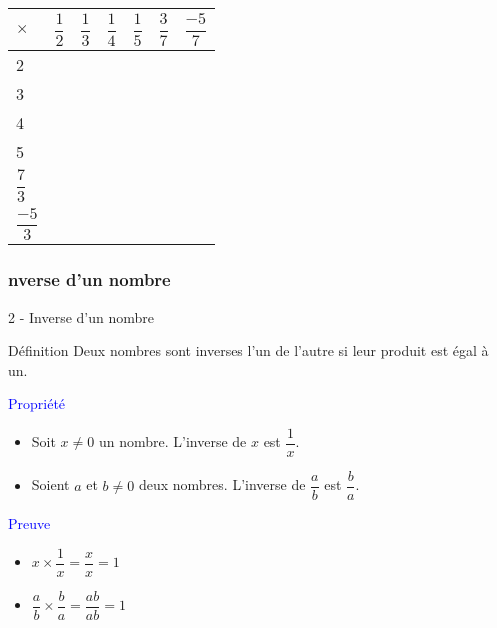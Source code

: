 \documentclass{beamer}
\begin{document}
\begin{frame}


  \begin{center}
    \begin{tabular}{| m{1.2cm} || m{1.2cm} | m{1.2cm} | m{1.2cm} | m{1.2cm} | m{1.2cm} | m{1.2cm} |}
      \hline
      $\times$ & $\dfrac{1}{2}$ & $\dfrac{1}{3}$ & $\dfrac{1}{4}$ & $\dfrac{1}{5}$ & $\dfrac{3}{7}$ & $\dfrac{-5}{7}$ \\
      \hline
      \hline
      2               & \phantom{$\dfrac{azerty}{a}$} & & & & & \\ 
      \hline
      3               & \phantom{$\dfrac{azerty}{a}$} & & & & & \\ 
      \hline
      4               & \phantom{$\dfrac{azerty}{a}$} & & & & & \\ 
      \hline
      5               & \phantom{$\dfrac{azerty}{a}$} & & & & & \\ 
      \hline
      $\dfrac{7}{3}$  & \phantom{$\dfrac{azerty}{a}$} & & & & & \\ 
      \hline
      $\dfrac{-5}{3}$ & \phantom{$\dfrac{azerty}{a}$} & & & & & \\ 
      \hline
    \end{tabular}
  \end{center}


\end{frame}



\begin{frame}
  \frametitle{nverse d'un nombre}

  \alert{2 - Inverse d'un nombre}

  \begin{alertblock}{Définition}
    Deux nombres sont inverses l'un de l'autre si leur produit est égal à un.
  \end{alertblock}

  \begin{block}{\textcolor{blue}{Propriété}}
    \begin{itemize}
    \item Soit $x \neq 0$ un nombre. L'inverse de $x$ est $\dfrac{1}{x}$. 
    \item Soient $a$ et $b \neq 0$ deux nombres. L'inverse de $\dfrac{a}{b}$ est $\dfrac{b}{a}$. 
    \end{itemize}
  \end{block}

  \begin{block}{\textcolor{blue}{Preuve}}
    \begin{multicols}{2}
      \begin{itemize}
      \item $x \times \dfrac{1}{x} = \dfrac{x}{x} = 1$ 
      \item $\dfrac{a}{b} \times \dfrac{b}{a} = \dfrac{ab}{ab} = 1$ 
      \end{itemize}
    \end{multicols}
  \end{block}
\end{frame}
\end{document}
